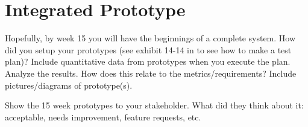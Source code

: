 \section{Integrated Prototype}
Hopefully, by week 15 you will have the beginnings of a complete system.
How did you setup your prototypes (see exhibit 14-14 in \cite{ulrich2020product-design-development} to see how to make a test plan)?
Include quantitative data from prototypes when you execute the plan.
Analyze the results.
How does this relate to the metrics/requirements?
Include pictures/diagrams of prototype(s).

Show the 15 week prototypes to your stakeholder.
What did they think about it:  acceptable, needs improvement, feature requests, etc.


